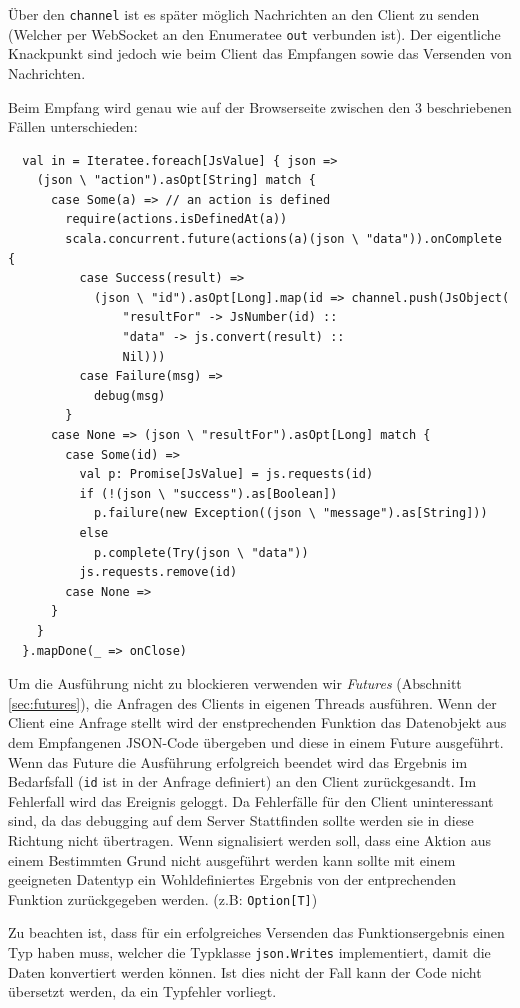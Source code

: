 Über den \texttt{channel} ist es später möglich Nachrichten an den Client zu senden (Welcher per
WebSocket an den Enumeratee \texttt{out} verbunden ist). Der eigentliche Knackpunkt sind jedoch wie
beim Client das Empfangen sowie das Versenden von Nachrichten.

Beim Empfang wird genau wie auf der Browserseite zwischen den 3 beschriebenen Fällen unterschieden:

\begin{lstlisting}
  val in = Iteratee.foreach[JsValue] { json =>    
    (json \ "action").asOpt[String] match {
      case Some(a) => // an action is defined    
        require(actions.isDefinedAt(a))
        scala.concurrent.future(actions(a)(json \ "data")).onComplete {
          case Success(result) =>
            (json \ "id").asOpt[Long].map(id => channel.push(JsObject(
                "resultFor" -> JsNumber(id) ::
                "data" -> js.convert(result) ::
                Nil)))
          case Failure(msg) =>
            debug(msg)
        }
      case None => (json \ "resultFor").asOpt[Long] match {
        case Some(id) =>          
          val p: Promise[JsValue] = js.requests(id)
          if (!(json \ "success").as[Boolean])
            p.failure(new Exception((json \ "message").as[String]))
          else
            p.complete(Try(json \ "data"))
          js.requests.remove(id)
        case None =>
      }
    }
  }.mapDone(_ => onClose)
\end{lstlisting}

Um die Ausführung nicht zu blockieren verwenden wir \textit{Futures} (Abschnitt\,\ref{sec:futures}),
die Anfragen des Clients in eigenen Threads ausführen. Wenn der Client eine Anfrage stellt wird der
enstprechenden Funktion das Datenobjekt aus dem Empfangenen JSON-Code übergeben und diese in einem
Future ausgeführt. Wenn das Future die Ausführung erfolgreich beendet wird das Ergebnis im
Bedarfsfall (\texttt{id} ist in der Anfrage definiert) an den Client zurückgesandt. Im Fehlerfall
wird das Ereignis geloggt. Da Fehlerfälle für den Client uninteressant sind, da das debugging auf
dem Server Stattfinden sollte werden sie in diese Richtung nicht übertragen. Wenn signalisiert
werden soll, dass eine Aktion aus einem Bestimmten Grund nicht ausgeführt werden kann sollte mit
einem geeigneten Datentyp ein Wohldefiniertes Ergebnis von der entprechenden Funktion zurückgegeben
werden. (z.B: \texttt{Option[T]})

Zu beachten ist, dass für ein erfolgreiches Versenden das Funktionsergebnis einen Typ haben muss,
welcher die Typklasse \texttt{json.Writes} implementiert, damit die Daten konvertiert werden können.
Ist dies nicht der Fall kann der Code nicht übersetzt werden, da ein Typfehler vorliegt.

